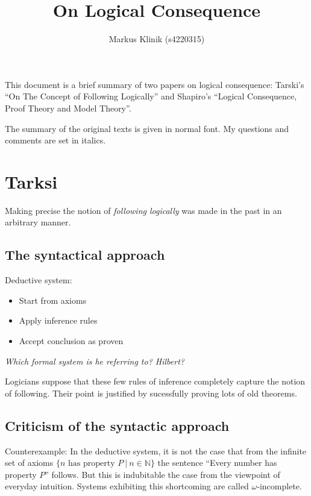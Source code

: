 \documentclass[a4paper]{article}
\begin{document}
\title{On Logical Consequence}
\author{Markus Klinik (s4220315)}
\maketitle

This document is a brief summary of two papers on logical consequence: Tarski's
``On The Concept of Following Logically'' and Shapiro's ``Logical Consequence,
Proof Theory and Model Theory''.

The summary of the original texts is given in normal font.  My questions and
comments are set in italics.

\section{Tarksi}

Making precise the notion of \emph{following logically} was made in the past in
an arbitrary manner.

\subsection{The syntactical approach}

Deductive system:

\begin{itemize}
    \item Start from axioms
    \item Apply inference rules
    \item Accept conclusion as proven
\end{itemize}

\emph{Which formal system is he referring to?  Hilbert?}

Logicians suppose that these few rules of inference completely capture the
notion of following.  Their point is justified by sucessfully proving lots of
old theorems.

\subsection{Criticism of the syntactic approach}

Counterexample: In the deductive system, it is not the
case that from the infinite set of axioms $\{ n\text{ has property }P\ |\ n \in
\mathbb{N} \}$ the sentence ``Every number has property $P$'' follows.  But this
is indubitable the case from the viewpoint of everyday intuition.  Systems
exhibiting this shortcoming are called $\omega$-incomplete.
\end{document}

